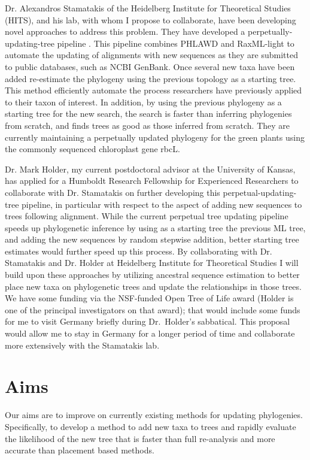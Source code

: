 \documentclass[10pt]{article}
\begin{document}
Dr. Alexandros Stamatakis of the Heidelberg Institute for Theoretical Studies (HITS), and his lab, with whom I propose to collaborate, have been developing novel approaches to address this problem. 
They have developed a perpetually-updating-tree pipeline \cite{izquierdo-carrasco_perpetual_????}. 
This pipeline combines PHLAWD \cite{smith_mega-phylogeny_2009} and RaxML-light \cite{stamatakis_RAxML-Light:_2012} to automate the updating of alignments with new sequences as they are submitted to public databases, such as NCBI GenBank. 
Once several new taxa have been added re-estimate the phylogeny using the previous topology as a starting tree. 
This method efficiently automate the process researchers have previously applied to their taxon of interest. 
In addition, by using the previous phylogeny as a starting tree for the new search, the search is faster than inferring phylogenies from scratch, and finds trees as good as those inferred from scratch. 
They  are currently maintaining a perpetually updated phylogeny for the green plants using the commonly sequenced chloroplast gene rbcL.

Dr. Mark Holder, my current postdoctoral advisor at the University of Kansas, has applied for a Humboldt Research Fellowship for Experienced Researchers to collaborate with Dr. 
Stamatakis on further developing this perpetual-updating-tree pipeline, in particular with respect to the aspect of adding new sequences to trees following alignment. 
While the current perpetual tree updating pipeline speeds up phylogenetic inference by using as a starting tree the previous ML tree, and adding the new sequences by random stepwise addition, better starting tree estimates would further speed up this process.
By collaborating with Dr. Stamatakis and Dr. Holder at Heidelberg Institute for Theoretical Studies I will build upon these approaches by utilizing ancestral sequence estimation to better place new taxa on phylogenetic trees and update the relationships in those trees.
We have some funding via the NSF-funded Open Tree of Life award (Holder is one of the principal investigators on that award); that would include some funds for me to visit Germany briefly during Dr.~Holder's sabbatical.
This proposal would allow me to stay in Germany for a longer period of time and collaborate more extensively with the Stamatakis lab.


\section*{Aims}
Our aims are to improve on currently existing methods for updating phylogenies. 
Specifically, to develop a method to add new taxa to trees and rapidly evaluate the likelihood of the new tree that is faster than full re-analysis and more accurate than placement based methods.
 
\end{document}
